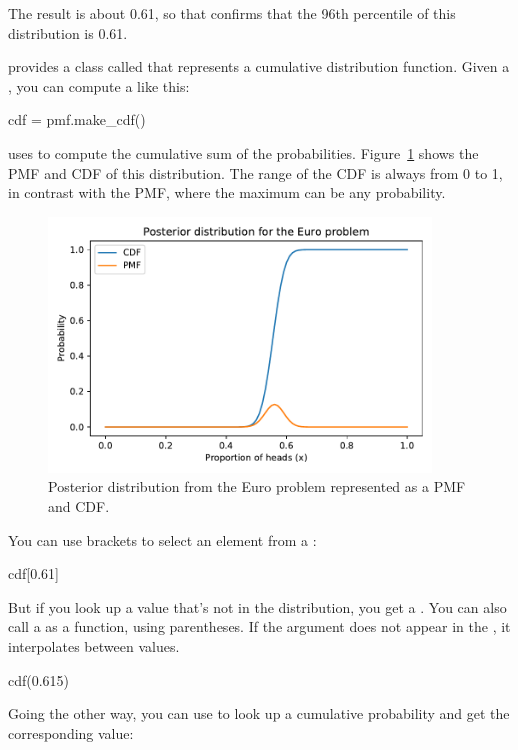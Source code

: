 \documentclass[12pt]{book}
\theoremstyle{exercise}
\begin{document}
The result is about 0.61, so that confirms that the 96th percentile of this distribution is 0.61.

 provides a class called  that represents a cumulative distribution function.
Given a , you can compute a  like this:

\begin{code}
cdf = pmf.make_cdf()
\end{code}

 uses  to compute the cumulative sum of the probabilities.
Figure~\ref{fig06-01} shows the PMF and CDF of this distribution.
The range of the CDF is always from 0 to 1, in contrast with the PMF, where the maximum can be any probability.

\begin{figure}
\centerline{\includegraphics[width=4in]{figs/fig06-01.pdf}}
\caption{Posterior distribution from the Euro problem represented as a PMF and CDF.}
\label{fig06-01}
\end{figure}

You can use brackets to select an element from a :

\begin{code}
cdf[0.61]
\end{code}

But if you look up a value that's not in the distribution, you get a .
You can also call a  as a function, using parentheses.
If the argument does not appear in the , it interpolates between values.

\begin{code}
cdf(0.615)
\end{code}

Going the other way, you can use  to look up a cumulative probability and get the corresponding value:
\end{document}
